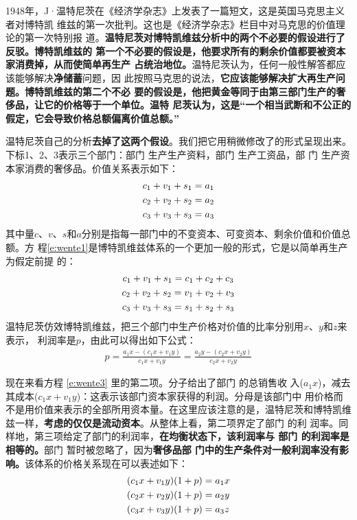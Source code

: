 1948年，J·温特尼茨在《经济学杂志》上发表了一篇短文，这是英国马克思主义者对博特凯
维兹的第一次批判。这也是《经济学杂志》栏目中对马克思的价值理论的第一次特别报
道。\textbf{温特尼茨对博特凯维兹分析中的两个不必要的假设进行了反驳。博特凯维兹的
  第一个不必要的假设是，他要求所有的剩余价值都要被资本家消费掉，从而使简单再生产
  占统治地位。}温特尼茨认为，任何一般性解答都应该能够解决\textbf{净储蓄}问题，因
此按照马克思的说法，\textbf{它应该能够解决扩大再生产问题。博特凯维兹的第二个不必
  要的假设是，他把黄金等同于由第三部门生产的奢侈品，让它的价格等于一个单位。温特
  尼茨认为，这是“一个相当武断和不公正的假定，它会导致价格总额偏离价值总额。”}

温特尼茨自己的分析\textbf{去掉了这两个假设}。我们把它用稍微修改了的形式呈现出来。
下标1、2、3表示三个部门：部门 生产生产资料，部门 生产工资品，部
门 生产资本家消费的奢侈品。价值关系表示如下：
\begin{gather}
  c_1+v_1+s_1=a_1  \label{e:wente1}\\
  c_2+v_2+s_2=a_2 \notag  \\
  c_3+v_3+s_3=a_3  \notag
\end{gather}
其中量$c、v、s和a$分别是指每一部门中的不变资本、可变资本、剩余价值和价值总额。方
程\eqref{e:wente1}是博特凯维兹体系的一个更加一般的形式，它是以简单再生产为假定前提
的：
\begin{gather}
  c_1+v_1+s_1=c_1+c_2+c_3  \label{e:wente2} \\
  c_2+v_2+s_2=v_1+v_2+v_3 \notag \\
  c_3+v_3+s_3=s_1+s_2+s_3  \notag
\end{gather}
温特尼茨仿效博特凯维兹，把三个部门中生产价格对价值的比率分别用$x$、$y$和$z$来表示，
利润率是$p$，由此可以得出如下公式：
\begin{gather}
  p = \frac{a_1x - (c_1x+v_1y)}{c_1x + v_1y} = \frac{a_2y-(c_2x+v_2y)}{c_2x +
    v_2y} \label{e:wente3}
\end{gather}

现在来看方程 \eqref{e:wente3} 里的第二项。分子给出了部门 的总销售收
入($a_1x$)，减去其成本($c_1x+v_1y$)：这表示该部门资本家获得的利润。分母是该部门中
用价格而不是用价值来表示的全部所用资本量。在这里应该注意的是，温特尼茨和博特凯维
兹一样，\textbf{考虑的仅仅是流动资本}。从整体上看，第二项界定了部门 的利
润率。同样地，第三项给定了部门的利润率，\textbf{在均衡状态下，该利润率与
  部门 的利润率是相等的。}部门 暂时被忽略了，因为\textbf{奢侈品部
  门中的生产条件对一般利润率没有影响。}该体系的价格关系现在可以表述如下：
\begin{align}
  (c_1x+v_1y)(1+p)&=a_1x  \label{e:wente4}\\
  (c_2x+v_2y)(1+p)&=a_2y \notag \\
  (c_3x+v_3y)(1+p)&=a_3z \notag
\end{align}

